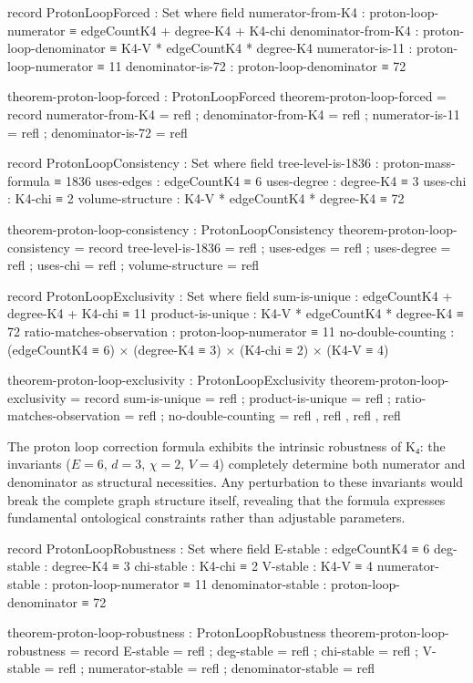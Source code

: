 \documentclass[11pt,a4paper]{book}
\begin{document}
\begin{code}
record ProtonLoopForced : Set where
  field
    numerator-from-K4 : proton-loop-numerator ≡ edgeCountK4 + degree-K4 + K4-chi
    denominator-from-K4 : proton-loop-denominator ≡ K4-V * edgeCountK4 * degree-K4
    numerator-is-11 : proton-loop-numerator ≡ 11
    denominator-is-72 : proton-loop-denominator ≡ 72

theorem-proton-loop-forced : ProtonLoopForced
theorem-proton-loop-forced = record
  { numerator-from-K4 = refl
  ; denominator-from-K4 = refl
  ; numerator-is-11 = refl
  ; denominator-is-72 = refl
  }

record ProtonLoopConsistency : Set where
  field
    tree-level-is-1836 : proton-mass-formula ≡ 1836
    uses-edges : edgeCountK4 ≡ 6
    uses-degree : degree-K4 ≡ 3
    uses-chi : K4-chi ≡ 2
    volume-structure : K4-V * edgeCountK4 * degree-K4 ≡ 72

theorem-proton-loop-consistency : ProtonLoopConsistency
theorem-proton-loop-consistency = record
  { tree-level-is-1836 = refl
  ; uses-edges = refl
  ; uses-degree = refl
  ; uses-chi = refl
  ; volume-structure = refl
  }

record ProtonLoopExclusivity : Set where
  field
    sum-is-unique : edgeCountK4 + degree-K4 + K4-chi ≡ 11
    product-is-unique : K4-V * edgeCountK4 * degree-K4 ≡ 72
    ratio-matches-observation : proton-loop-numerator ≡ 11
    no-double-counting : (edgeCountK4 ≡ 6) × (degree-K4 ≡ 3) × (K4-chi ≡ 2) × (K4-V ≡ 4)

theorem-proton-loop-exclusivity : ProtonLoopExclusivity
theorem-proton-loop-exclusivity = record
  { sum-is-unique = refl
  ; product-is-unique = refl
  ; ratio-matches-observation = refl
  ; no-double-counting = refl , refl , refl , refl
  }
\end{code}

The proton loop correction formula exhibits the intrinsic robustness of K₄: the invariants ($E = 6$, 
$d = 3$, $\chi = 2$, $V = 4$) completely determine both numerator and denominator as structural necessities. Any perturbation to these invariants would break the complete graph structure itself, revealing that the formula expresses fundamental ontological constraints rather than adjustable parameters.

\begin{code}
record ProtonLoopRobustness : Set where
  field
    E-stable : edgeCountK4 ≡ 6
    deg-stable : degree-K4 ≡ 3
    chi-stable : K4-chi ≡ 2
    V-stable : K4-V ≡ 4
    numerator-stable : proton-loop-numerator ≡ 11
    denominator-stable : proton-loop-denominator ≡ 72

theorem-proton-loop-robustness : ProtonLoopRobustness
theorem-proton-loop-robustness = record
  { E-stable = refl
  ; deg-stable = refl
  ; chi-stable = refl
  ; V-stable = refl
  ; numerator-stable = refl
  ; denominator-stable = refl
  }
\end{code}
\end{document}

